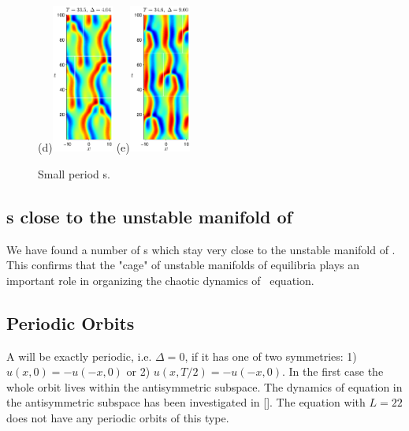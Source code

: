 \begin{figure}[t]
\begin{center}
(d)\includegraphics[width=0.18\textwidth]{figs/ks22rpo033.5-04.04.eps}
(e)\includegraphics[width=0.18\textwidth]{figs/ks22rpo034.6-09.60.eps}
\end{center}
\caption{Small period \rpo s.
        }
\end{figure}


\subsection{\Rpo s close to the unstable manifold of  }
We have found a number of \rpo s which stay very close to the
unstable manifold of .  This confirms that the "cage" of
unstable manifolds of equilibria plays an important role in
organizing the chaotic dynamics of \KS\ equation.

\subsection{Periodic Orbits}
A \rpo will be exactly periodic, i.e. $\Delta = 0$, if it has one of
two symmetries: 1) $u(x,0) = -u(-x,0)$ or 2) $u(x,T/2) = -u(-x,0)$.
In the first case the whole orbit lives within the antisymmetric
subspace. The dynamics of \KS equation in the antisymmetric subspace
has been investigated in []. The \KS
equation with $L = 22$ does not have any periodic orbits of this
type. %

